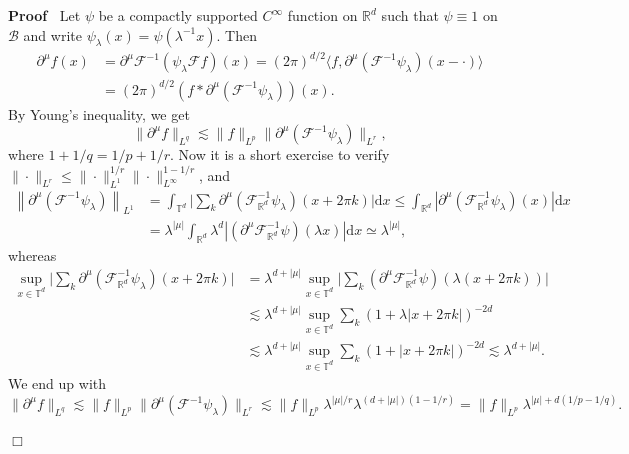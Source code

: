 \documentclass[a4paper,11pt]{article}
\newcommand{\cdummy}{\cdot}
\newcommand{\mathd}{\mathrm{d}}
\newcommand{\nocomma}{}
\newenvironment{proof}{\noindent\textbf{Proof\ }}{\hspace*{\fill}$\Box$\medskip}
\newcommand{\CB}{\mathscr{B}}
\newcommand{\CF}{\mathscr{F}}
\begin{document}
\begin{proof}
  Let $\psi$ be a compactly supported $C^{\infty}$ function on $\mathbb{R}^d$
  such that $\psi \equiv 1$ on $\CB$ and write $\psi_{\lambda} (x) = \psi
  (\lambda^{- 1} x)$. Then
  \begin{align*}
      \partial^{{\mu}} f (x) & = \partial^{{\mu}} \CF^{- 1} ( \psi_{\lambda} \CF f ) (x) = (2 \pi)^{d / 2} \langle f,    \partial^{{\mu}} ( \CF^{- 1} \psi_{\lambda} ) (x - \cdummy) \rangle \\
      & = (2 \pi)^{d / 2} ( f \ast     \partial^{{\mu}} ( \CF^{- 1} \psi_{\lambda} ) ) (x).
   \end{align*}
  By Young's inequality, we get
  \[ \| \partial^{{\mu}} f \|_{L^q} \lesssim \| f \|_{L^p} \|
     \partial^{{\mu}} ( \CF^{- 1} \psi_{\lambda} )
     \|_{L^r}, \]
  where $1 + 1 / q = 1 / p + 1 / r$. Now it is a short exercise to verify $\|
  \cdummy \|_{L^r} \leqslant \| \cdummy \|_{L^1}^{1 / r} \| \cdummy
  \|_{L^{\infty}}^{1 - 1 / r}$, and
  \begin{align*}
     \left\| \partial^{{\mu}} \left( \CF^{- 1} \psi_{\lambda} \right) \right\|_{L^1} & = \int_{\mathbb{T}^d} \Big| \sum_k \partial^{{\mu}} \left( \CF^{- 1}_{\mathbb{R}^d} \psi_{\lambda} \right) (x + 2 \pi k) \Big| \mathd x \leqslant \int_{\mathbb{R}^d} | \partial^{{\mu}} ( \CF^{- 1}_{\mathbb{R}^d} \psi_{\lambda} ) (x) | \mathd x \\
      & = \lambda^{| {\mu} |} \int_{\mathbb{R}^d} \lambda^d | ( \partial^{{\mu}} \CF^{- 1}_{\mathbb{R}^d} \psi ) (\lambda x)| \mathd x \simeq \lambda^{| {\mu} |} \nocomma,
  \end{align*}
  whereas
  \begin{align*}
     \sup_{x \in \mathbb{T}^d} \Big| \sum_k \partial^{{\mu}} (\CF^{- 1}_{\mathbb{R}^d} \psi_{\lambda}) (x + 2 \pi k) \Big| & =  \lambda^{d + | {\mu} |} \sup_{x \in \mathbb{T}^d} \Big| \sum_k ( \partial^{{\mu}} \CF^{- 1}_{\mathbb{R}^d} \psi ) (\lambda (x + 2 \pi k)) \Big| \\
     & \lesssim \lambda^{d + | {\mu} |} \sup_{x \in \mathbb{T}^d} \sum_k (1 + \lambda | x + 2 \pi k |)^{- 2 d} \\
     & \lesssim \lambda^{d + | {\mu} |} \sup_{x \in \mathbb{T}^d} \sum_k (1 + | x + 2 \pi k |)^{- 2 d} \lesssim \lambda^{d + | {\mu} |}.
  \end{align*}
  We end up with
  \[ \| \partial^{{\mu}} f \|_{L^q} \lesssim \| f \|_{L^p} \|
     \partial^{{\mu}} ( \CF^{- 1} \psi_{\lambda} )
     \|_{L^r} \lesssim \| f \|_{L^p} \lambda^{| {\mu} | / r}
     \lambda^{(d + | {\mu} |) (1 - 1 / r)} = \| f \|_{L^p} \lambda^{|
     {\mu} | + d (1 / p - 1 / q)} . \]
  
\end{proof}
\end{document}
